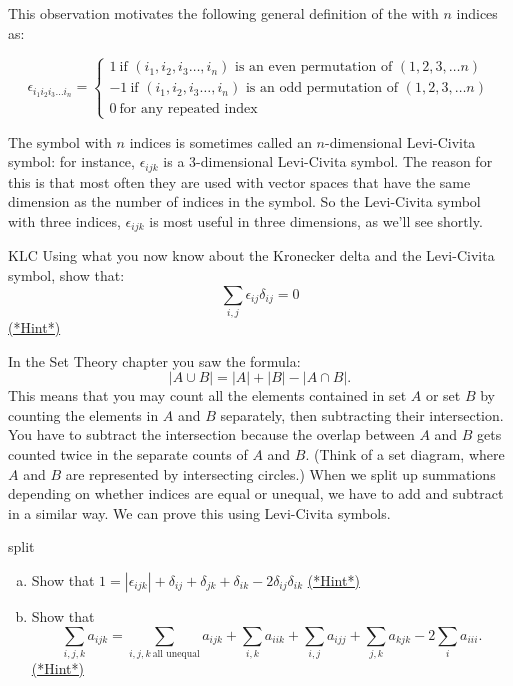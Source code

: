 This observation motivates the following general definition  of the  with $n$ indices as:

\[ \epsilon_{i_1 i_2 i_3…i_n}=
\begin{cases}
1 ~ \text{if $(i_1,i_2,i_3…,i_n)$ is an even permutation of $(1,2,3, \ldots n)$}\\
-1 ~ \text{if $(i_1,i_2,i_3…,i_n)$ is an odd permutation of $(1,2,3, \ldots n)$}\\
0 ~ \text{for any repeated index}
\end{cases} \]

The symbol with $n$ indices is sometimes called an $n$-dimensional Levi-Civita symbol: for instance, $\epsilon_{ijk}$ is a 3-dimensional Levi-Civita symbol.  The reason for this is that most often they are used with vector spaces that have the same dimension as the number of indices in the symbol.  So   the Levi-Civita symbol with three indices, $\epsilon_{ijk}$ is most useful in three dimensions, as we'll see shortly.

\begin{exercise}{KLC}
Using what you now know about the Kronecker delta and the Levi-Civita symbol, show that:
\[
\sum_{i,j} \epsilon_{ij} \delta_{ij}=0
\]
\hyperref[sec:sigma:hints]{(*Hint*)} 
\end{exercise}

In the Set Theory chapter you saw the formula:
\[ |A \cup B| = |A| + |B| - |A \cap B|.\]
This means that you may count all the elements contained in set $A$ or set $B$ by counting the elements in $A$ and $B$ separately, then subtracting their intersection.  You have to  subtract the intersection because  the overlap between $A$ and $B$ gets counted twice in the separate counts of $A$ and $B$.  (Think of a set diagram, where $A$ and $B$ are represented by intersecting circles.)  When we split up summations depending on whether indices are equal or unequal, we have to add and subtract in a similar way. We can prove this using Levi-Civita symbols.
  
\begin{exercise}{split}
\begin{enumerate}[(a)]
\item
Show that $1=|\epsilon_{ijk}|+\delta_{ij}+\delta_{jk}+\delta_{ik}-2\delta_{ij}\delta_{ik}$ 
\hyperref[sec:sigma:hints]{(*Hint*)} 
\item
Show that 
\[
\sum_{i,j,k} a_{ijk}=\sum_{i,j,k~\text{all unequal}}a_{ijk}+\sum_{i,k}a_{iik}+\sum_{i,j}a_{ijj}+\sum_{j,k}a_{kjk}-2\sum_{i}a_{iii}.
\]
\hyperref[sec:sigma:hints]{(*Hint*)} 
\end{enumerate}
\end{exercise}


